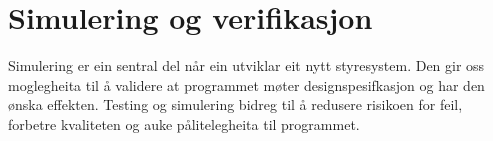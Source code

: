 \chapter{Simulering og verifikasjon}
\thispagestyle{fancy}

Simulering er ein sentral del når ein utviklar eit nytt styresystem.
Den gir oss moglegheita til å validere at programmet møter designspesifkasjon og har den ønska effekten.
Testing og simulering bidreg til å redusere risikoen for feil, forbetre kvaliteten og auke pålitelegheita til programmet.


